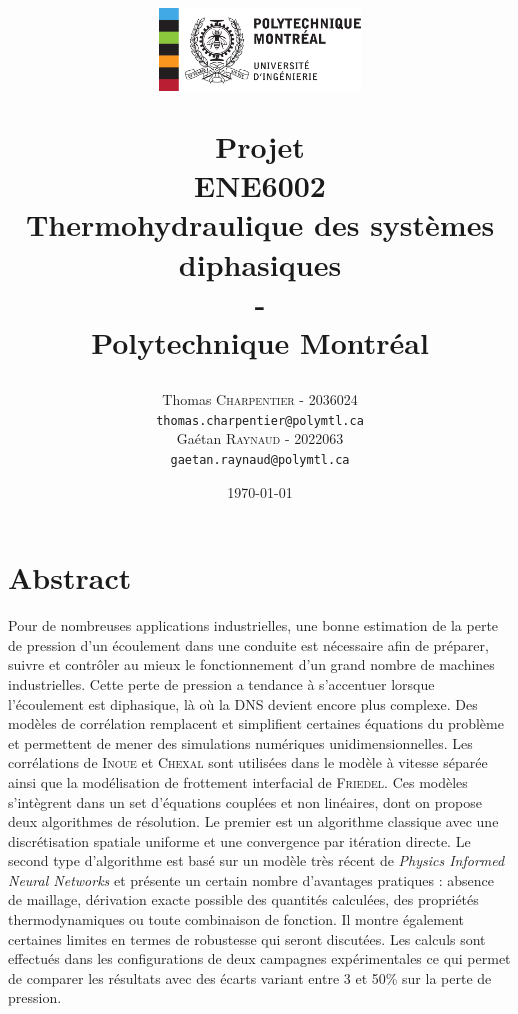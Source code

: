 \documentclass[12pt]{article}
\title{
\centerline{\includegraphics[width=0.4\textwidth]{images/poly}}
\vspace{0.5 cm}
Projet \\
\vspace{1cm}
ENE6002
\large  \\
Thermohydraulique des systèmes diphasiques \\ 
\Huge-\\
\normalsize Polytechnique Montréal
  }
\author{
    \begin{minipage}{.46\textwidth}
        \begin{center}
            Thomas \textsc{Charpentier} - 2036024\\
            \texttt{thomas.charpentier@polymtl.ca}
        \end{center}
    \end{minipage}%
    \hfill\vrule\hfill
    \begin{minipage}{0.46\textwidth}
        \begin{center}
            Gaétan \textsc{Raynaud} - 2022063\\
            \texttt{gaetan.raynaud@polymtl.ca}
        \end{center}
    \end{minipage}
}
\date{\today}
\begin{document}
\maketitle
\section*{Abstract}

Pour de nombreuses applications industrielles, une bonne estimation de la perte de pression d'un écoulement dans une conduite est nécessaire afin de préparer, suivre et contrôler au mieux le fonctionnement d'un grand nombre de machines industrielles. Cette perte de pression a tendance à s'accentuer lorsque l'écoulement est diphasique, là où la DNS devient encore plus complexe. Des modèles de corrélation remplacent et simplifient certaines équations du problème et permettent de mener des simulations numériques unidimensionnelles. Les corrélations de \textsc{Inoue} et \textsc{Chexal} sont utilisées dans le modèle à vitesse séparée ainsi que la modélisation de frottement interfacial de \textsc{Friedel}. Ces modèles s'intègrent dans un set d'équations couplées et non linéaires, dont on propose deux algorithmes de résolution. Le premier est un algorithme \og classique\fg{} avec une discrétisation spatiale uniforme et une convergence par itération directe. Le second type d'algorithme est basé sur un modèle très récent de \textit{Physics Informed Neural Networks} et présente un certain nombre d'avantages pratiques : absence de maillage, dérivation exacte possible des quantités calculées, des propriétés thermodynamiques ou toute combinaison de fonction. Il montre également certaines limites en termes de robustesse qui seront discutées. Les calculs sont effectués dans les configurations de deux campagnes expérimentales ce qui permet de comparer les résultats avec des écarts variant entre 3 et 50\% sur la perte de pression.

\newpage
\tableofcontents
\newpage

\newpage

\newpage

\newpage

\newpage

\newpage

\newpage

\newpage
%

\FloatBarrier
\newpage


\end{document}
